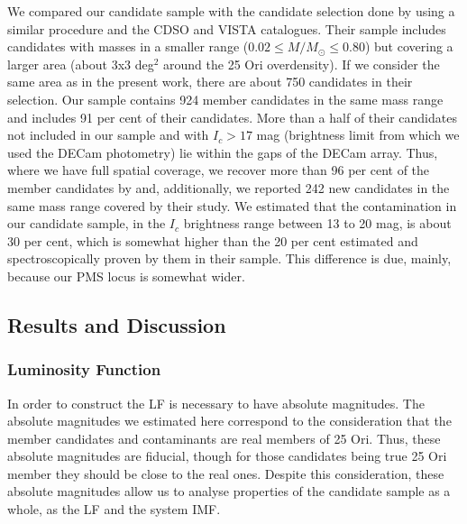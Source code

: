 \documentclass[12pt]{article}
\begin{document}
We compared our candidate sample with the candidate selection done by \citet{Downes2014} using a similar procedure and the CDSO and VISTA catalogues. Their sample includes candidates with masses in a smaller range ($0.02\le M/M_\odot\le0.80$) but covering a larger area (about 3x3 deg$^2$ around the 25 Ori overdensity). If we consider the same area as in the present work, there are about 750 candidates in their selection. Our sample contains 924 member candidates in the same mass range and includes 91 per cent of their candidates. More than a half of their candidates not included in our sample and with $I_c>17$ mag (brightness limit from which we used the DECam photometry) lie within the gaps of the DECam array. Thus, where we have full spatial coverage, we recover more than 96 per cent of the member candidates by \citet{Downes2014} and, additionally, we reported 242 new candidates in the same mass range covered by their study. We estimated that the contamination in our candidate sample, in the $I_c$ brightness range between 13 to 20 mag, is about 30 per cent, which is somewhat higher than the 20 per cent estimated and spectroscopically proven by them in their sample. This difference is due, mainly, because our PMS locus is somewhat wider.

\subsection{Results and Discussion}
\label{sec_IMF:results}

\subsubsection{Luminosity Function}
\label{sec_IMF:LF}

In order to construct the LF is necessary to have absolute magnitudes. The absolute magnitudes we estimated here correspond to the consideration that the member candidates and contaminants are real members of 25 Ori. Thus, these absolute magnitudes are fiducial, though for those candidates being true 25 Ori member they should be close to the real ones. Despite this consideration, these absolute magnitudes allow us to analyse properties of the candidate sample as a whole, as the LF and the system IMF.
\end{document}
